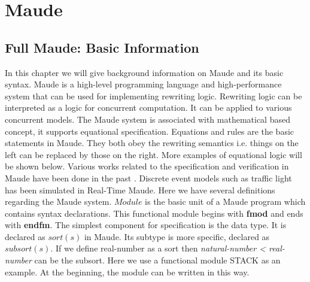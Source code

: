 \documentclass[a4paper,11pt]{report}
\begin{document}
\newpage
\chapter{Maude}
\label{sec:maude}
\section{Full Maude: Basic Information}
In this chapter we will give background information on Maude and its basic syntax. Maude is a high-level programming language and high-performance system that can be used for implementing rewriting logic. Rewriting logic can be interpreted as a logic for concurrent computation. It can be applied to various concurrent models. The Maude system is associated with mathematical based concept, it supports equational specification. Equations and rules are the basic statements in Maude. They both obey the rewriting semantics i.e. things on the left can be replaced by those on the right. More examples of equational logic will be shown below. Various works related to the specification and verification in Maude have been done in the past \cite{raey}. Discrete event models such as traffic light has been simulated in Real-Time Maude.
\newline \newline
Here we have several definitions regarding the Maude system.
$Module$ is the basic unit of a Maude program which contains syntax declarations. This functional module begins with {\bf fmod} and ends with {\bf endfm}. The simplest component for specification is the data type. It is declared as $sort(s) $ in Maude. Its subtype is more specific, declared as $subsort(s) $. If we define real-number as a sort then \textit{natural-number < real-number} can be the subsort. Here we use a functional module STACK as an example. At the beginning, the module can be written in this way.
\end{document}
